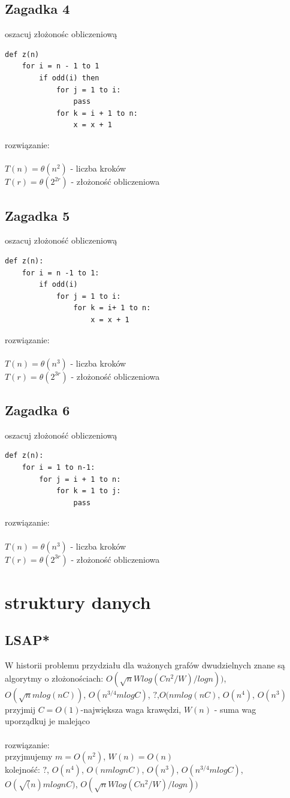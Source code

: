 \documentclass{article}
\begin{document}
\subsection*{Zagadka 4}
oszacuj złożonośc obliczeniową
\begin{lstlisting}
def z(n)
	for i = n - 1 to 1
		if odd(i) then
			for j = 1 to i:
				pass
			for k = i + 1 to n:
				x = x + 1
\end{lstlisting}
rozwiązanie: \\\\
$T(n) = \theta(n^2)$ - liczba kroków\\
$T(r) = \theta(2^{2r})$ - złożoność obliczeniowa

\subsection*{Zagadka 5}
oszacuj złożoność obliczeniową
\begin{lstlisting}
def z(n):
	for i = n -1 to 1:
		if odd(i)
			for j = 1 to i:
				for k = i+ 1 to n:
					x = x + 1
\end{lstlisting}
rozwiązanie: \\\\
$T(n) = \theta(n^3)$ - liczba kroków\\
$T(r) = \theta(2^{3r})$ - złożoność obliczeniowa

\subsection*{Zagadka 6}
oszacuj złożoność obliczeniową
\begin{lstlisting}
def z(n):
	for i = 1 to n-1:
		for j = i + 1 to n:
			for k = 1 to j:
				pass
\end{lstlisting}
rozwiązanie: \\\\
$T(n) = \theta(n^3)$ - liczba kroków\\
$T(r) = \theta(2^{3r})$ - złożoność obliczeniowa

\section{struktury danych}
\subsection*{LSAP*}
W historii problemu przydziału dla ważonych grafów dwudzielnych znane są algorytmy o złożonościach:
$O(\sqrt{n}Wlog(Cn^2/W)/logn))$, $O(\sqrt{n}mlog(nC))$, $O(n^{3/4}mlogC)$, $?$,$O(nmlog(nC)$, $O(n^4)$, $O(n^3)$
\\ przyjmij $C = O(1)$-największa waga krawędzi,  $W(n)$ - suma wag \\ uporządkuj je malejąco \\\\
rozwiązanie: \\
przyjmujemy $m = O(n^2)$, $ W(n) = O(n)$ \\
kolejność: $?$, $O(n^4)$,  $O(nmlognC)$, $O(n^3)$, $O(n^{3/4}mlogC)$, $O(\sqrt(n)mlognC)$, $O(\sqrt{n}Wlog(Cn^2/W)/logn))$
\end{document}
